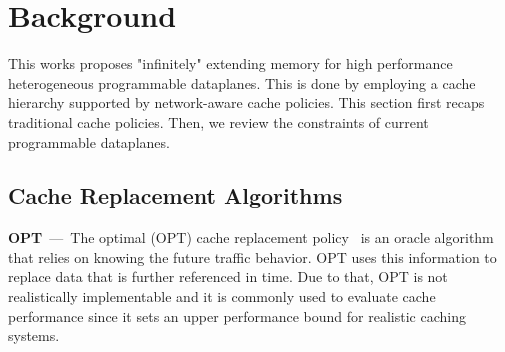 


\section{Background}\label{sec:back}
This works proposes "infinitely" extending memory for high performance heterogeneous programmable dataplanes.
This is done by employing a cache hierarchy supported by network-aware cache policies.
This section first recaps traditional cache policies. 
Then, we review the constraints of current programmable dataplanes.

\subsection{Cache Replacement Algorithms}
\textbf{OPT}~---~The optimal (OPT) cache replacement policy~\cite{Belady:66} is an oracle algorithm that relies on knowing the future traffic behavior.
OPT uses this information to replace data that is further referenced in time.
Due to that, OPT is not realistically implementable and it is commonly used to evaluate cache performance since it sets an upper performance bound for realistic caching systems.

